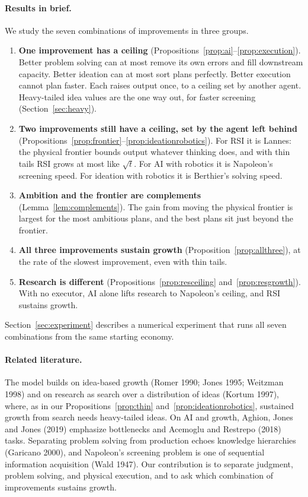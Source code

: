\documentclass[11pt]{article}
\newcommand{\Nap}{\textcolor{nap}{Napoleon}}
\newcommand{\Ber}{\textcolor{ber}{Berthier}}
\newcommand{\Lan}{\textcolor{lan}{Lannes}}
\theoremstyle{remark}
\begin{document}
\paragraph{Results in brief.} We study the seven combinations of improvements in three groups.
\begin{enumerate}
  \item \textbf{One improvement has a ceiling} (Propositions~\ref{prop:ai}--\ref{prop:execution}). Better problem solving can at most remove its own errors and fill downstream capacity. Better ideation can at most sort plans perfectly. Better execution cannot plan faster. Each raises output once, to a ceiling set by another agent. Heavy-tailed idea values are the one way out, for faster screening (Section~\ref{sec:heavy}).
  \item \textbf{Two improvements still have a ceiling, set by the agent left behind} (Propositions~\ref{prop:frontier}--\ref{prop:ideationrobotics}). For RSI it is \Lan: the physical frontier bounds output whatever thinking does, and with thin tails RSI grows at most like $\sqrt t$. For AI with robotics it is \Nap's screening speed. For ideation with robotics it is \Ber's solving speed.
  \item \textbf{Ambition and the frontier are complements} (Lemma~\ref{lem:complements}). The gain from moving the physical frontier is largest for the most ambitious plans, and the best plans sit just beyond the frontier.
  \item \textbf{All three improvements sustain growth} (Proposition~\ref{prop:allthree}), at the rate of the slowest improvement, even with thin tails.
  \item \textbf{Research is different} (Propositions~\ref{prop:resceiling} and~\ref{prop:resgrowth}). With no executor, AI alone lifts research to \Nap's ceiling, and RSI sustains growth.
\end{enumerate}
Section~\ref{sec:experiment} describes a numerical experiment that runs all seven combinations from the same starting economy.

\paragraph{Related literature.} The model builds on idea-based growth (Romer 1990; Jones 1995; Weitzman 1998) and on research as search over a distribution of ideas (Kortum 1997), where, as in our Propositions~\ref{prop:thin} and~\ref{prop:ideationrobotics}, sustained growth from search needs heavy-tailed ideas. On AI and growth, Aghion, Jones and Jones (2019) emphasize bottlenecks and Acemoglu and Restrepo (2018) tasks. Separating problem solving from production echoes knowledge hierarchies (Garicano 2000), and \Nap's screening problem is one of sequential information acquisition (Wald 1947). Our contribution is to separate judgment, problem solving, and physical execution, and to ask which combination of improvements sustains growth.
\end{document}
